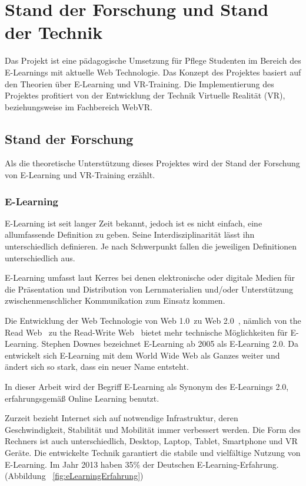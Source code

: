 \chapter{Stand der Forschung und Stand der Technik}

Das Projekt ist eine pädagogische Umsetzung für Pflege Studenten im Bereich des E-Learnings mit aktuelle Web Technologie. Das Konzept des Projektes basiert auf den Theorien über E-Learning und VR-Training. Die Implementierung des Projektes profitiert von der Entwicklung der Technik Virtuelle Realität (VR), beziehungsweise im Fachbereich WebVR.

\section{Stand der Forschung}

Als die theoretische Unterstützung dieses Projektes wird der Stand der Forschung von E-Learning und VR-Training erzählt.

 \subsection{E-Learning}
 E-Learning ist seit langer Zeit bekannt, jedoch ist es nicht einfach, eine allumfassende Definition zu geben. Seine Interdisziplinarität lässt ihn unterschiedlich definieren. Je nach Schwerpunkt fallen die jeweiligen Definitionen unterschiedlich aus.

E-Learning umfasst laut Kerres \citep{1} \glqq bei denen elektronische oder digitale Medien für die Präsentation und Distribution von Lernmaterialien und/oder Unterstützung zwischenmenschlicher Kommunikation zum Einsatz kommen.\grqq

Die Entwicklung der Web Technologie von \glqq Web 1.0\grqq\ zu \glqq Web 2.0\grqq\  \citep{3}, nämlich von \glqq the Read Web \grqq\ zu \glqq the Read-Write Web\grqq\ \citep{4} bietet mehr technische Möglichkeiten für E-Learning. Stephen Downes \citep{2} bezeichnet E-Learning ab 2005 als E-Learning 2.0. Da \glqq entwickelt sich E-Learning mit dem World Wide Web als Ganzes weiter und ändert sich so stark, dass ein neuer Name entsteht.\grqq\

In dieser Arbeit wird der Begriff E-Learning als Synonym des E-Learnings 2.0, erfahrungsgemäß Online Learning benutzt.
 
Zurzeit bezieht Internet sich auf notwendige Infrastruktur, deren Geschwindigkeit, Stabilität und Mobilität immer verbessert werden. Die Form des Rechners ist auch unterschiedlich, Desktop, Laptop, Tablet, Smartphone und VR Geräte. Die entwickelte Technik garantiert die stabile und vielfältige Nutzung von E-Learning. Im Jahr 2013 haben 35\% der Deutschen E-Learning-Erfahrung. (Abbildung ~\ref{fig:eLearningErfahrung})

